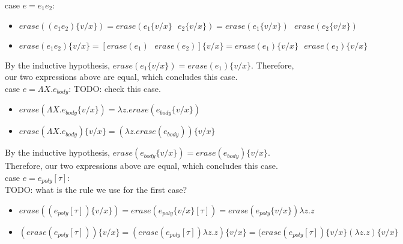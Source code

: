 \documentclass[10pt]{article}
\begin{document}
\begin{exercise}
{\sc case} $e = e_1e_2$:
\begin{itemize}
\item $\mathit{erase}((e_1e_2)\{v/x\}) = \mathit{erase}(e_1\{v/x\} \text{ } e_2\{v/x\}) =  \mathit{erase}(e_1\{v/x\})\text{ } \mathit{erase}(e_2\{v/x\})$
\item $\mathit{erase}(e_1e_2)\{v/x\} =  [\mathit{erase}(e_1)\text{ } \mathit{erase}(e_2)] \{v/x\} = \mathit{erase}(e_1)\{v/x\} \text{ } \mathit{erase}(e_2)\{v/x\}$\\
\end{itemize}

By the inductive hypothesis, $\mathit{erase}(e_1\{v/x\}) = \mathit{erase}(e_1)\{v/x\}$. Therefore, our two expressions above are equal, which concludes this case. \checkmark\\

{\sc case} $e = \Lambda X.e_{body}$: TODO: check this case.
\begin{itemize}
\item $\mathit{erase}(\Lambda X.e_{body}\{v/x\}) = \lambda z. \mathit{erase}(e_{body}\{v/x\}) $
\item $\mathit{erase}(\Lambda X.e_{body})\{v/x\} = (\lambda z. \mathit{erase}(e_{body}))\{v/x\}$ 

\end{itemize}

By the inductive hypothesis, $\mathit{erase}(e_{body}\{v/x\}) = \mathit{erase}(e_{body})\{v/x\}$. Therefore, our two expressions above are equal, which concludes this case. \checkmark\\


{\sc case} $e = e_{poly}[\tau] $:\\

TODO: what is the rule we use for the first case?\\

\begin{itemize}
\item $\mathit{erase}((e_{poly}[\tau])\{v/x\}) = \mathit{erase}(e_{poly}\{v/x\}[\tau]) = \mathit{erase}(e_{poly} \{v/x\}) \lambda z.z$
\item $(\mathit{erase}(e_{poly}[\tau]))\{v/x\} = (\mathit{erase}(e_{poly}[\tau]) \lambda z.z)\{v/x\} = (\mathit{erase}(e_{poly}[\tau])\{v/x\} (\lambda z.z) \{v/x\}$\\
\end{itemize}


\end{exercise}
\end{document}
